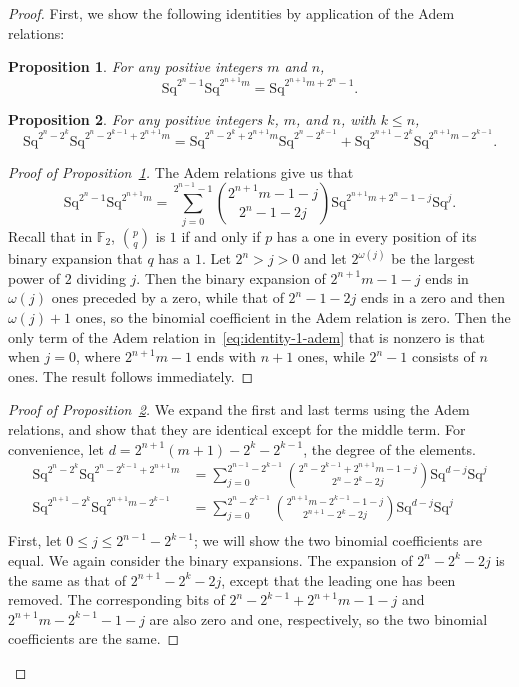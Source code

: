 \documentclass{article}
\newcommand{\F}{\mathbb{F}}
\newcommand{\Sq}{\mathrm{Sq}}
\newtheorem{prop}{Proposition}
\begin{document}
\begin{proof}
  First, we show the following identities by application of the Adem relations:
  \begin{prop}\label{prop:identity-1}
    For any positive integers $m$ and $n$,
    \[\Sq^{2^n-1}\Sq^{2^{n+1}m}=\Sq^{2^{n+1}m+2^n-1}.\]
  \end{prop}
  \begin{prop}\label{prop:identity-2}
    For any positive integers $k$, $m$, and $n$, with $k\leq n$,
    \[\Sq^{2^n-2^k}\Sq^{2^n-2^{k-1}+2^{n+1}m}=\Sq^{2^n-2^k+2^{n+1}m}\Sq^{2^n-2^{k-1}}+\Sq^{2^{n+1}-2^k}\Sq^{2^{n+1}m-2^{k-1}}.\]
  \end{prop}
  \begin{proof}[Proof of Proposition~\ref{prop:identity-1}]
    The Adem relations give us that
  \begin{equation}\Sq^{2^n-1}\Sq^{2^{n+1}m} = \sum_{j=0}^{2^{n-1}-1}\binom{2^{n+1}m-1-j}{2^n-1-2j}\Sq^{2^{n+1}m+2^n-1-j}\Sq^j.\label{eq:identity-1-adem}\end{equation}
    Recall that in $\F_2$, $\binom{p}{q}$ is $1$ if and only if $p$ has a one in every position of its binary expansion that $q$ has a $1$.  Let $2^n>j>0$ and let $2^{\omega(j)}$ be the largest power of $2$ dividing $j$.  Then the binary expansion of $2^{n+1}m-1-j$ ends in $\omega(j)$ ones preceded by a zero, while that of $2^n-1-2j$ ends in a zero and then $\omega(j)+1$ ones, so the binomial coefficient in the Adem relation is zero.  Then the only term of the Adem relation in~\eqref{eq:identity-1-adem} that is nonzero is that when $j=0$, where $2^{n+1}m-1$ ends with $n+1$ ones, while $2^n-1$ consists of $n$ ones.  The result follows immediately.
  \end{proof}
  \begin{proof}[Proof of Proposition~\ref{prop:identity-2}]
    We expand the first and last terms using the Adem relations, and show that they are identical except for the middle term. For convenience, let $d=2^{n+1}(m+1)-2^k-2^{k-1}$, the degree of the elements.
    \begin{align*}
      \Sq^{2^n-2^k}\Sq^{2^n-2^{k-1}+2^{n+1}m} &= \sum_{j=0}^{2^{n-1}-2^{k-1}} \binom{2^n-2^{k-1}+2^{n+1}m-1-j}{2^n-2^k-2j} \Sq^{d-j}\Sq^j \\
      \Sq^{2^{n+1}-2^k}\Sq^{2^{n+1}m-2^{k-1}} &=\sum_{j=0}^{2^n-2^{k-1}}\binom{2^{n+1}m-2^{k-1}-1-j}{2^{n+1}-2^k-2j}\Sq^{d-j}\Sq^j \\
    \end{align*}
    First, let $0\leq j\leq 2^{n-1}-2^{k-1}$; we will show the two binomial coefficients are equal.  We again consider the binary expansions.  The expansion of $2^n-2^k-2j$ is the same as that of $2^{n+1}-2^k-2j$, except that the leading one has been removed.  The corresponding bits of $2^n-2^{k-1}+2^{n+1}m-1-j$ and $2^{n+1}m-2^{k-1}-1-j$ are also zero and one, respectively, so the two binomial coefficients are the same.


\end{proof}
\end{proof}
\end{document}
